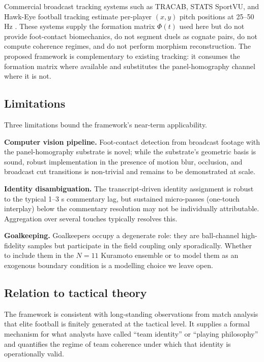 \documentclass[11pt,twocolumn,a4paper]{article}
\theoremstyle{definition}
\theoremstyle{remark}
\begin{document}
Commercial broadcast tracking systems such as TRACAB, STATS
SportVU, and Hawk-Eye football tracking estimate per-player
$(x,y)$ pitch positions at 25--50 Hz \citep{theagarajan2021,dorazio2009}.
These systems supply the formation matrix $\Phi(t)$ used here but do
not provide foot-contact biomechanics, do not segment duels as cognate
pairs, do not compute coherence regimes, and do not perform morphism
reconstruction. The proposed framework is complementary to existing
tracking: it consumes the formation matrix where available and
substitutes the panel-homography channel where it is not.

\subsection{Limitations}

Three limitations bound the framework's near-term applicability.

\textbf{Computer vision pipeline.} Foot-contact detection from
broadcast footage with the panel-homography substrate is novel; while
the substrate's geometric basis is sound, robust implementation in
the presence of motion blur, occlusion, and broadcast cut transitions
is non-trivial and remains to be demonstrated at scale.

\textbf{Identity disambiguation.} The transcript-driven identity
assignment is robust to the typical 1--3 s commentary lag, but
sustained micro-passes (one-touch interplay) below the commentary
resolution may not be individually attributable. Aggregation over
several touches typically resolves this.

\textbf{Goalkeeping.} Goalkeepers occupy a degenerate role: they are
ball-channel high-fidelity samples but participate in the field
coupling only sporadically. Whether to include them in the
$N{=}11$ Kuramoto ensemble or to model them as an exogenous boundary
condition is a modelling choice we leave open.

\subsection{Relation to tactical theory}

The framework is consistent with long-standing observations from match
analysis \citep{reep1968,hughes2005,memmert2017} that elite football is
finitely generated at the tactical level. It supplies a formal mechanism
for what analysts have called ``team identity'' or ``playing
philosophy'' and quantifies the regime of team coherence under which
that identity is operationally valid.
\end{document}
